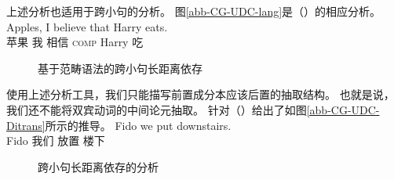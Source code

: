\noindent
上述分析也适用于跨小句的分析。
图\vref{abb-CG-UDC-lang}是（）的相应分析。
\ea
\gll Apples, I believe that Harry eats.\\
     苹果 我 相信 \textsc{comp} Harry 吃\\
\z
\begin{figure}
\centerline{%
}
\caption{\label{abb-CG-UDC-lang}基于范畴语法的跨小句长距离依存}
\end{figure}%
%
使用上述分析工具，我们只能描写前置成分本应该后置的抽取结构。
也就是说，我们还不能将双宾动词的中间论元抽取\citep[]{Steedman85a-u}。
 \citet[]{Pollard88a}针对（）给出了如图\vref{abb-CG-UDC-Ditrans}所示的推导。
\ea
\gll Fido we put downstairs. \\
     Fido 我们 放置 楼下 \\
\z
\begin{figure}
\centerline{%
}
\caption{\label{abb-CG-UDC-Ditrans}跨小句长距离依存的分析}
\end{figure}%

